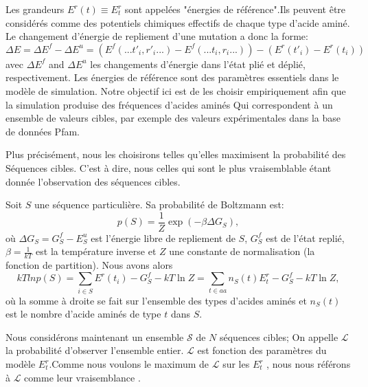 Les grandeurs $E^r(t) \equiv E_t^r$ sont appelées "énergies de référence".Ils peuvent être considérés comme des potentiels chimiques effectifs de chaque type d'acide aminé. Le changement d'énergie de repliement d'une mutation a donc la forme:
\begin{equation} \label{eq:deltaE}
  \Delta E=\Delta E^f - \Delta E^u=(E^f(...t'_i,r'_i...) - E^f(...t_i,r_i...)) -(E^r(t'_i) - E^r(t_i))
\end{equation} 
avec $\Delta E^f$ and $\Delta E^u$ les changements d'énergie dans l'état plié et déplié, respectivement.
Les énergies de référence sont des paramètres essentiels dans le modèle de simulation. Notre objectif ici
est de les choisir empiriquement afin que la simulation produise des fréquences d'acides aminés
Qui correspondent à un ensemble de valeurs cibles, par exemple des valeurs expérimentales dans la base de données Pfam.

Plus précisément, nous les choisirons telles qu'elles maximisent la probabilité des
Séquences cibles. C'est à dire, nous celles qui sont le plus vraisemblable étant donnée l'observation des séquences cibles.

Soit $S$ une séquence particulière. Sa probabilité de Boltzmann est:
\begin{equation}
  p(S)=\frac{1}{Z}\exp(-\beta \Delta G_S),
\end{equation}
où $\Delta G_S=G_S^f - E^u_S $ est l'énergie libre de repliement de $S$, $G^f_S$ est de l'état replié,$\beta =\frac{1}{kT}$ est la température inverse et $Z$ une constante de normalisation (la fonction de partition). Nous avons alors
\begin{equation}
kTln p(S) = \sum_{i\in S} E^r(t_i) - G^f_S - kT \ln Z = \sum_{t\in aa}n_S(t)E^r_t - G^f_S - kT\ln Z,
\end{equation}
où la somme à droite se fait sur l'ensemble des types d'acides aminés et $n_S(t)$ est le nombre d'acide aminés de type $t$ dans $S$.

Nous considérons maintenant un ensemble $\mathcal{S}$ de $N$ séquences cibles; On appelle $\mathcal{L}$ la probabilité d'observer l'ensemble entier. $\mathcal{L}$ est fonction des paramètres du modèle $E_t^r$.Comme nous voulons le maximum de $\mathcal{L}$ sur les $E_t^r$ , nous nous référons  à  $\mathcal{L}$ comme leur vraisemblance \cite{Kleinman06}.

